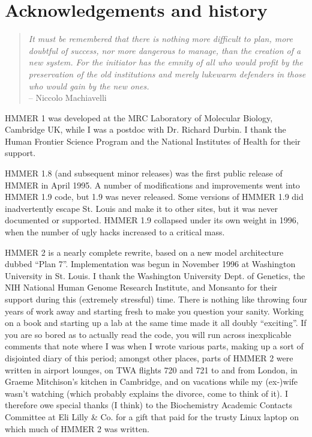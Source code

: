 \chapter {Acknowledgements and history}

\begin{quote}
\textit{
It must be remembered that there is nothing more difficult to plan, more
doubtful of success, nor more dangerous to manage, than the creation of
a new system.  For the initiator has the emnity of all who would profit
by the preservation of the old institutions and merely lukewarm defenders
in those who would gain by the new ones.\\}
\hspace*{\fill} -- Niccolo Machiavelli
\end{quote}

HMMER 1 was developed at the MRC Laboratory of Molecular Biology,
Cambridge UK, while I was a postdoc with Dr. Richard Durbin. I thank
the Human Frontier Science Program and the National Institutes of
Health for their support. 

HMMER 1.8 (and subsequent minor releases) was the first public release
of HMMER in April 1995. A number of modifications and improvements
went into HMMER 1.9 code, but 1.9 was never released. Some versions of
HMMER 1.9 did inadvertently escape St. Louis and make it to other
sites, but it was never documented or supported. HMMER 1.9 collapsed
under its own weight in 1996, when the number of ugly hacks increased
to a critical mass.

HMMER 2 is a nearly complete rewrite, based on a new model
architecture dubbed ``Plan 7''. Implementation was begun in November
1996 at Washington University in St. Louis. I thank the Washington
University Dept. of Genetics, the NIH National Human Genome Research
Institute, and Monsanto for their support during this (extremely
stressful) time. There is nothing like throwing four years of work
away and starting fresh to make you question your sanity. Working on a
book \cite{Durbin98} and starting up a lab at the same time made it
all doubly ``exciting''. If you are so bored as to actually read the
code, you will run across inexplicable comments that note where I was
when I wrote various parts, making up a sort of disjointed diary of
this period; amongst other places, parts of HMMER 2 were written in
airport lounges, on TWA flights 720 and 721 to and from London, in
Graeme Mitchison's kitchen in Cambridge, and on vacations while my
(ex-)wife wasn't watching (which probably explains the divorce, come
to think of it).  I therefore owe special thanks (I think) to the
Biochemistry Academic Contacts Committee at Eli Lilly \& Co. for a
gift that paid for the trusty Linux laptop on which much of HMMER 2
was written.

